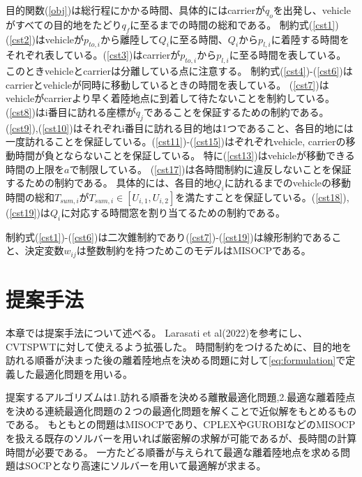 \documentclass[11pt,a4paper,dvipdfmx,titlepage,uplatex]{jsarticle}
\theoremstyle{mystyle}
\newcommand{\0}{\mathbf{0}}
\begin{document}
	目的関数(\ref{obj})は総行程にかかる時間、具体的にはcarrierが$q_o$を出発し、vehicleがすべての目的地をたどり$q_f$に至るまでの時間の総和である。
	制約式(\ref{cst1})(\ref{cst2})はvehicleが$p_{to,i}$から離陸して$Q_i$に至る時間、$Q_i$から$p_{l,i}$に着陸する時間をそれぞれ表している。(\ref{cst3})はcarrierが$p_{to,i}$から$p_{l,i}$に至る時間を表している。
	このときvehicleとcarrierは分離している点に注意する。
	制約式(\ref{cst4})-(\ref{cst6})はcarrierとvehicleが同時に移動しているときの時間を表している。
	(\ref{cst7})はvehicleがcarrierより早く着陸地点に到着して待たないことを制約している。
	(\ref{cst8})はi番目に訪れる座標が$q_j$であることを保証するための制約である。
	(\ref{cst9}),(\ref{cst10})はそれぞれi番目に訪れる目的地は1つであること、各目的地には一度訪れることを保証している。(\ref{cst11})-(\ref{cst15})はぞれぞれvehicle, carrierの移動時間が負とならないことを保証している。
	特に(\ref{cst13})はvehicleが移動できる時間の上限を$a$で制限している。
	(\ref{cst17})は各時間制約に違反しないことを保証するための制約である。
	具体的には、各目的地$Q_i$に訪れるまでのvehicleの移動時間の総和$T_{sum,i}$が$T_{sum,i} \in [U_{i,1},U_{i,2}]$を満たすことを保証している。(\ref{cst18}),(\ref{cst19})は$Q_i$に対応する時間窓を割り当てるための制約である。
	
	制約式(\ref{cst1})-(\ref{cst6})は二次錐制約であり(\ref{cst7})-(\ref{cst19})は線形制約であること、決定変数$w_{ij}$は整数制約を持つためこのモデルはMISOCPである。
	
	\clearpage
	\section{提案手法}\label{sec:SimulatedAnnealing}
	
	
	本章では提案手法について述べる。
	Larasati et al(2022)\cite{larasati2022integrated}を参考にし、CVTSPWTに対して使えるよう拡張した。
	時間制約をつけるために、目的地を訪れる順番が決まった後の離着陸地点を決める問題に対して\ref{eq:formulation}で定義した最適化問題を用いる。
	
	提案するアルゴリズムは1.訪れる順番を決める離散最適化問題,2.最適な離着陸点を決める連続最適化問題の２つの最適化問題を解くことで近似解をもとめるものである。
	もともとの問題はMISOCPであり、CPLEXやGUROBIなどのMISOCPを扱える既存のソルバーを用いれば厳密解の求解が可能であるが、長時間の計算時間が必要である。
	一方たどる順番が与えられて最適な離着陸地点を求める問題はSOCPとなり高速にソルバーを用いて最適解が求まる。
	
\end{document}
